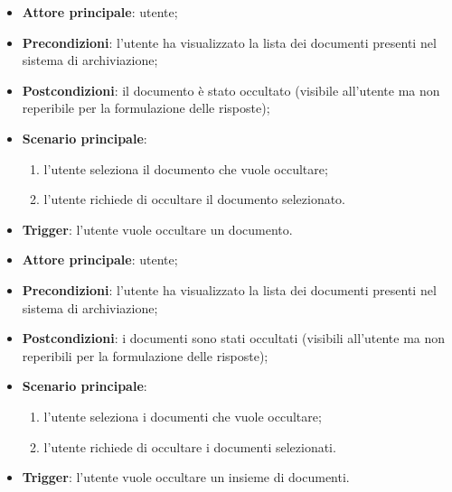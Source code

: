 \documentclass[10pt, a4paper]{article}
\begin{document}
    \begin{itemize}
        \item \textbf{Attore principale}: utente;
        \item \textbf{Precondizioni}: l’utente ha visualizzato la lista dei documenti presenti nel sistema di archiviazione;
        \item \textbf{Postcondizioni}: il documento è stato occultato (visibile all’utente ma non reperibile per la formulazione delle risposte);
        \item \textbf{Scenario principale}:
            \begin{enumerate}
                \item l’utente seleziona il documento che vuole occultare;
                \item l’utente richiede di occultare il documento selezionato.
            \end{enumerate}
        \item \textbf{Trigger}: l’utente vuole occultare un documento.
    \end{itemize}

    \begin{itemize}
        \item \textbf{Attore principale}: utente;
        \item \textbf{Precondizioni}: l’utente ha visualizzato la lista dei documenti presenti nel sistema di archiviazione;
        \item \textbf{Postcondizioni}: i documenti sono stati occultati (visibili all’utente ma non reperibili per la formulazione delle risposte);
        \item \textbf{Scenario principale}:
            \begin{enumerate}
                \item l’utente seleziona i documenti che vuole occultare;
                \item l’utente richiede di occultare i documenti selezionati.
            \end{enumerate}
        \item \textbf{Trigger}: l’utente vuole occultare un insieme di documenti.
    \end{itemize}
\end{document}
